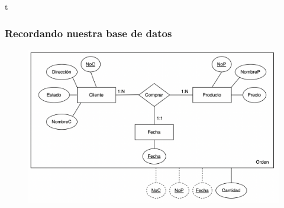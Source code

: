 \documentclass[
	10pt, %
	aspectratio=169, %
]{beamer}
\begin{document}

\begin{frame}{t}
	
	\frametitle{Recordando nuestra base de datos}
	
	\begin{figure}[h]
		\centering
		\includegraphics[scale=0.5]{bd.png}
	\end{figure}
	
	
\end{frame}

\end{document}
